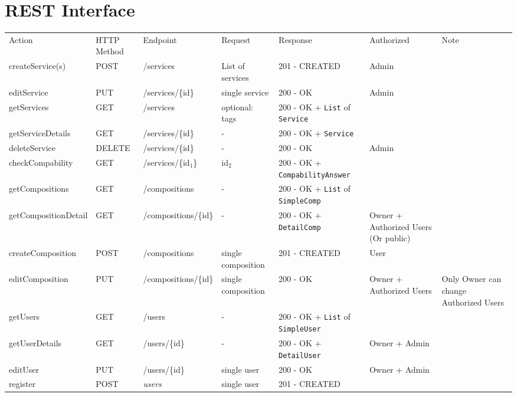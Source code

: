 \documentclass[11pt]{article}
\author{Christian Richter}
\date{\today}
\title{}
\begin{document}
\section{REST Interface}
\label{sec:orgfae1a5d}
\begin{center}
\begin{tabular}{lllllll}
Action & HTTP Method & Endpoint & Request & Response & Authorized & Note\\
createService(s) & POST & /services & List of services & 201 - CREATED & Admin & \\
editService & PUT & /services/\{id\} & single service & 200 - OK & Admin & \\
getServices & GET & /services & optional: tags & 200 - OK + \texttt{List} of \texttt{Service} &  & \\
getServiceDetails & GET & /services/\{id\} & - & 200 - OK + \texttt{Service} &  & \\
deleteService & DELETE & /services/\{id\} & - & 200 - OK & Admin & \\
\hline
checkCompability & GET & /services/\{id\(_{\text{1}}\)\} & id\(_{\text{2}}\) & 200 - OK + \texttt{CompabilityAnswer} &  & \\
\hline
getCompositions & GET & /compositions & - & 200 - OK + \texttt{List} of \texttt{SimpleComp} &  & \\
getCompositionDetail & GET & /compositions/\{id\} & - & 200 - OK + \texttt{DetailComp} & Owner + Authorized Users (Or public) & \\
createComposition & POST & /compositions & single composition & 201 - CREATED & User & \\
editComposition & PUT & /compositions/\{id\} & single composition & 200 - OK & Owner + Authorized Users & Only Owner can change Authorized Users\\
\hline
getUsers & GET & /users & - & 200 - OK + \texttt{List} of \texttt{SimpleUser} &  & \\
getUserDetails & GET & /users/\{id\} & - & 200 - OK + \texttt{DetailUser} & Owner + Admin & \\
editUser & PUT & /users/\{id\} & single user & 200 - OK & Owner + Admin & \\
register & POST & \emph{users} & single user & 201 - CREATED &  & \\
\hline
\end{tabular}
\end{center}
\end{document}
